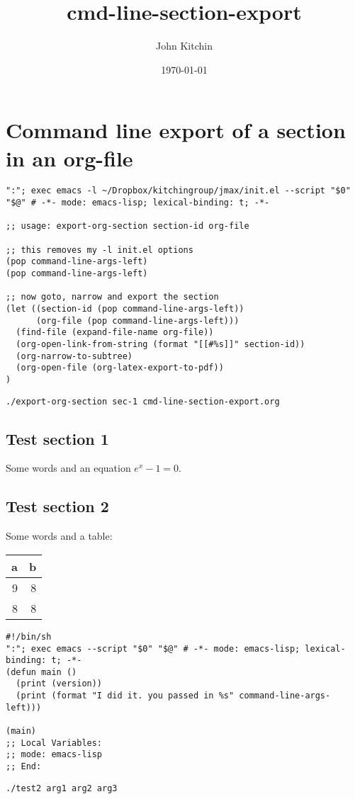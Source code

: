 \documentclass[11pt]{article}
\author{John Kitchin}
\date{\today}
\title{cmd-line-section-export}
\begin{document}
\maketitle
\tableofcontents

\section{Command line export of a section in an org-file}
\label{sec-1}

\begin{verbatim}
":"; exec emacs -l ~/Dropbox/kitchingroup/jmax/init.el --script "$0" "$@" # -*- mode: emacs-lisp; lexical-binding: t; -*-

;; usage: export-org-section section-id org-file

;; this removes my -l init.el options
(pop command-line-args-left)
(pop command-line-args-left)

;; now goto, narrow and export the section
(let ((section-id (pop command-line-args-left))
      (org-file (pop command-line-args-left)))
  (find-file (expand-file-name org-file))
  (org-open-link-from-string (format "[[#%s]]" section-id))
  (org-narrow-to-subtree)
  (org-open-file (org-latex-export-to-pdf))
)
\end{verbatim}


\begin{verbatim}
./export-org-section sec-1 cmd-line-section-export.org
\end{verbatim}

\subsection{Test section 1}
\label{sec-1-1}

Some words and an equation \(e^x-1=0\).


\subsection{Test section 2}
\label{sec-1-2}

Some words and a table:

\begin{center}
\begin{tabular}{rr}
a & b\\
\hline
9 & 8\\
8 & 8\\
\end{tabular}
\end{center}


\begin{verbatim}
#!/bin/sh
":"; exec emacs --script "$0" "$@" # -*- mode: emacs-lisp; lexical-binding: t; -*-
(defun main ()
  (print (version))
  (print (format "I did it. you passed in %s" command-line-args-left)))

(main)
;; Local Variables:
;; mode: emacs-lisp
;; End:
\end{verbatim}


\begin{verbatim}
./test2 arg1 arg2 arg3
\end{verbatim}
\end{document}
